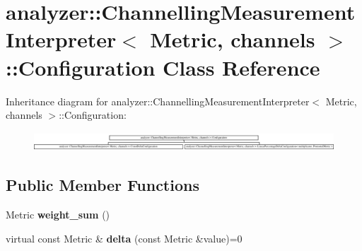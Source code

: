 \hypertarget{classanalyzer_1_1_channelling_measurement_interpreter_1_1_configuration}{}\section{analyzer\+::Channelling\+Measurement\+Interpreter$<$ Metric, channels $>$\+::Configuration Class Reference}
\label{classanalyzer_1_1_channelling_measurement_interpreter_1_1_configuration}
Inheritance diagram for analyzer\+::Channelling\+Measurement\+Interpreter$<$ Metric, channels $>$\+::Configuration\+:\begin{figure}[H]
\begin{center}
\leavevmode
\includegraphics[height=0.701754cm]{classanalyzer_1_1_channelling_measurement_interpreter_1_1_configuration}
\end{center}
\end{figure}
\subsection*{Public Member Functions}
\begin{DoxyCompactItemize}
\item 
\mbox{\label{classanalyzer_1_1_channelling_measurement_interpreter_1_1_configuration_a957d6d4f22251b2e8eb527fa532c1ece}} 
Metric {\bfseries weight\+\_\+sum} ()
\item 
\mbox{\label{classanalyzer_1_1_channelling_measurement_interpreter_1_1_configuration_ab80cfab116cc850ef02300376a4c0344}} 
virtual const Metric \& {\bfseries delta} (const Metric \&value)=0
\end{DoxyCompactItemize}
